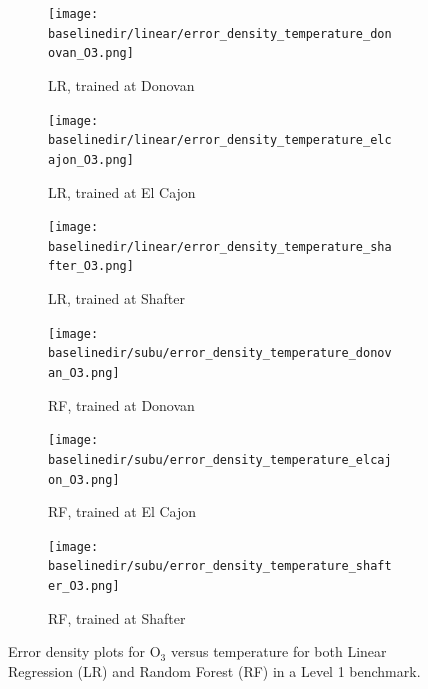 \documentclass[journal abbreviation, manuscript]{copernicus}
\newcommand{\textus}[1]{$_{\text{#1}}$}
\begin{document}
\begin{figure}[H]
\centering
\begin{subfigure}{0.33\textwidth}
\texttt{[image: \\baselinedir/linear/error\_density\_temperature\_donovan\_O3.png]}
\caption{LR, trained at Donovan}
\end{subfigure}
\begin{subfigure}{0.33\textwidth}
\texttt{[image: \\baselinedir/linear/error\_density\_temperature\_elcajon\_O3.png]}
\caption{LR, trained at El Cajon}
\end{subfigure}
\begin{subfigure}{0.33\textwidth}
\texttt{[image: \\baselinedir/linear/error\_density\_temperature\_shafter\_O3.png]}
\caption{LR, trained at Shafter}
\end{subfigure}
\begin{subfigure}{0.33\textwidth}
\texttt{[image: \\baselinedir/subu/error\_density\_temperature\_donovan\_O3.png]}
\caption{RF, trained at Donovan}
\end{subfigure}
\begin{subfigure}{0.33\textwidth}
\texttt{[image: \\baselinedir/subu/error\_density\_temperature\_elcajon\_O3.png]}
\caption{RF, trained at El Cajon}
\end{subfigure}
\begin{subfigure}{0.33\textwidth}
\texttt{[image: \\baselinedir/subu/error\_density\_temperature\_shafter\_O3.png]}
\caption{RF, trained at Shafter}
\end{subfigure}
\caption{Error density plots for O\textus{3} versus temperature for both Linear Regression (LR) and Random Forest (RF) in a Level 1 benchmark.}
\label{fig:error-density-O3-temp}
\end{figure}
\end{document}
